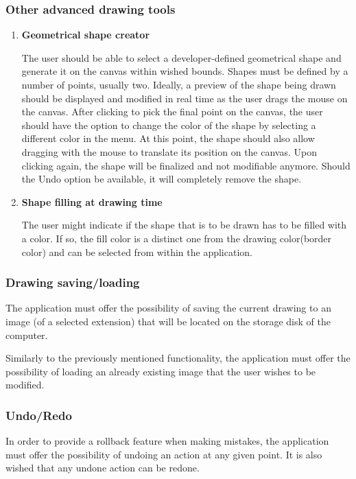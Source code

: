 \documentclass[12pt]{article}
\begin{document}
\subsubsection{Other advanced drawing tools}
\begin{enumerate}

\item  \textbf{Geometrical shape creator}

The user should be able to select a developer-defined geometrical shape and generate it on the canvas within wished bounds. Shapes must be defined by a number of points, usually two. Ideally, a preview of the shape being drawn should be displayed and modified in real time as the user drags the mouse on the canvas. After clicking to pick the final point on the canvas, the user should have the option to change the color of the shape by selecting a different color in the menu. At this point, the shape should also allow dragging with the mouse to translate its position on the canvas. Upon clicking again, the shape will be finalized and not modifiable anymore. Should the Undo option be available, it will completely remove the shape.

\item \textbf{Shape filling at drawing time}

The user might indicate if the shape that is to be drawn has to be filled with a color. If so, the fill color is a distinct one from the drawing color(border color) and can be selected from within the application.

\end{enumerate}

\subsubsection{Drawing saving/loading}

The application must offer the possibility of saving the current drawing to an image (of a selected extension) that will be located on the storage disk of the computer.

Similarly to the previously mentioned functionality, the application must offer the possibility of loading an already existing image that the user wishes to be modified.

\subsubsection{Undo/Redo}

In order to provide a rollback feature when making mistakes, the application must offer the possibility of undoing an action at any given point. It is also wished that any undone action can be redone.
\end{document}

